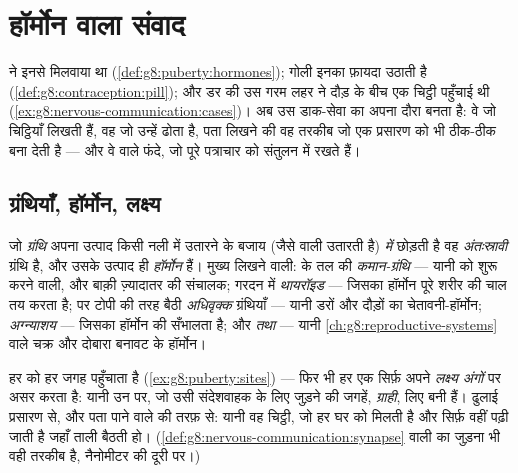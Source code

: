 \chapter{हॉर्मोन वाला संवाद}\label{ch:g8:hormonal-communication}

 ने इनसे मिलवाया था (\cref{def:g8:puberty:hormones}); गोली इनका
फ़ायदा उठाती है (\cref{def:g8:contraception:pill}); और डर की उस गरम लहर
ने दौड़ के बीच एक चिट्ठी पहुँचाई थी
(\cref{ex:g8:nervous-communication:cases})। अब उस डाक-सेवा का अपना दौरा
बनता है: वे  जो चिट्ठियाँ लिखती हैं, वह  जो उन्हें ढोता है,
पता लिखने की वह तरकीब जो एक प्रसारण को भी ठीक-ठीक बना देती है --- और वे
 वाले फंदे, जो पूरे पत्राचार को संतुलन में रखते हैं।

\section{ग्रंथियाँ, हॉर्मोन, लक्ष्य}

\begin{definition}[अंतःस्रावी ग्रंथियाँ]\label{def:g8:hormonal-communication:glands}
जो \emph{ग्रंथि} अपना उत्पाद किसी नली में उतारने के बजाय
(जैसे  वाली उतारती है) \emph{ में} छोड़ती है वह
\emph{अंतःस्रावी} ग्रंथि है, और उसके उत्पाद ही
\emph{हॉर्मोन} हैं। मुख्य लिखने वाली:  के तल की
\emph{कमान-ग्रंथि} --- यानी  को शुरू करने वाली, और बाक़ी
ज़्यादातर की संचालक; गरदन में \emph{थायरॉइड} --- जिसका हॉर्मोन पूरे शरीर
की चाल तय करता है;  पर टोपी की तरह बैठी \emph{अधिवृक्क} ग्रंथियाँ
--- यानी डरों और दौड़ों का चेतावनी-हॉर्मोन; \emph{अग्न्याशय} --- जिसका
हॉर्मोन  की  सँभालता है; और \emph{ तथा } ---
यानी \cref{ch:g8:reproductive-systems} वाले चक्र और दोबारा बनावट के
हॉर्मोन।
\end{definition}

\begin{proposition}[ग्राही से पता]\label{prop:g8:hormonal-communication:address}
 हर  को हर जगह पहुँचाता है (\cref{ex:g8:puberty:sites}) ---
फिर भी हर एक सिर्फ़ अपने \emph{लक्ष्य अंगों} पर असर
करता है: यानी उन  पर, जो उसी संदेशवाहक के लिए जुड़ने की जगहें,
\emph{ग्राही}, लिए बनी हैं। ढुलाई प्रसारण से, और पता पाने वाले की तरफ़
से: यानी वह चिट्ठी, जो हर घर को मिलती है और सिर्फ़ वहीं पढ़ी जाती है
जहाँ ताली बैठती हो। (\cref{def:g8:nervous-communication:synapse} वाली
 का जुड़ना भी वही तरकीब है, नैनोमीटर की दूरी पर।)
\end{proposition}
\admitted

